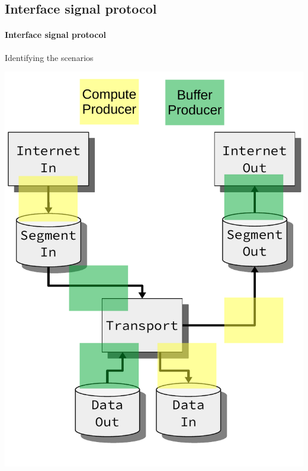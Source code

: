 \begin{frame}[fragile]
    \subsection{Interface signal protocol}
    \framesubtitle{Interface signal protocol}
Identifying the scenarios

\centering
\includegraphics[scale=0.40]{implementation/signal_protocol_identification.pdf}

\end{frame}

